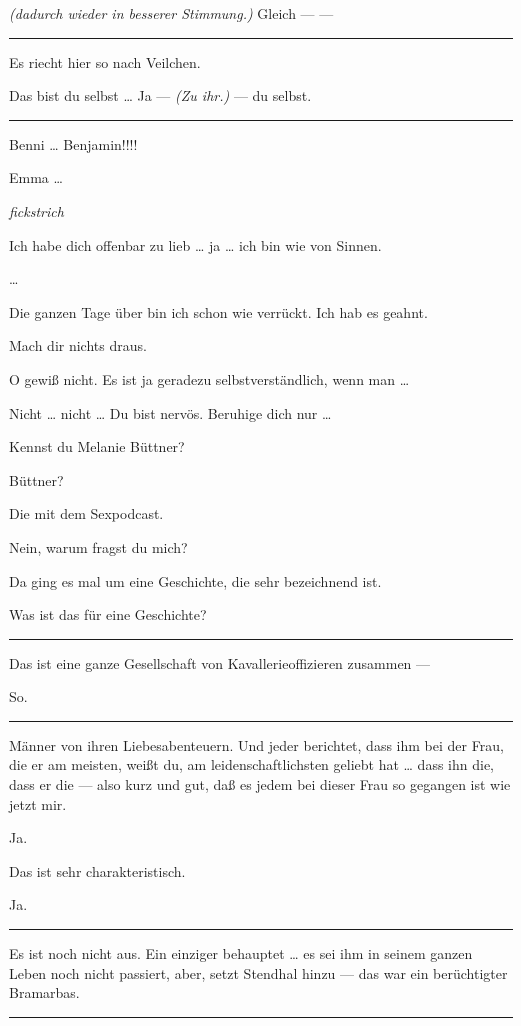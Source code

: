 \documentclass[
	final,
	a4paper,
	ngerman,
	mpinclude = true, %
	twoside = true,
	open = right,
	cleardoublepage = plain,
	DIV = 13,
	BCOR = 1cm,
	titlepage = firstiscover,
	]{scrbook}
\newcommand{\marginnote}[1]{\marginpar{\singlespacing\raggedright\footnotesize#1}}
\newcommand{\direction}[1]{\textit{(#1)}}
\newcommand{\hiat}{%
	\begin{center}
		\tiny
		\raisebox{0.5ex}{\rule{0.3\linewidth}{0.4pt}}
		\textit{fickstrich}
		\raisebox{0.5ex}{\rule{0.3\linewidth}{0.4pt}}
	\end{center}
}
\newenvironment{deletion}{%
		\vspace{0.25\baselineskip}
		\hrule
		\vspace{0.25\baselineskip}
		\color{darkgray}
	}{
		\color{black}
		\vspace{0.25\baselineskip}
		\hrule 
		\vspace{0.25\baselineskip}
	}
\newcommand{\thecharacter}[1]{\textup{\textsc{#1}}\xspace}
\newcommand{\theherr}{\thecharacter{Benjamin}}
\newcommand{\thefrau}{\thecharacter{Emma}}
\newcommand{\character}[1]{\item[#1:]}
\newcommand{\herr}{\character{\theherr}}
\newcommand{\frau}{\character{\thefrau}}
\begin{document}
\begin{play}
	\herr
	\direction{dadurch wieder in besserer Stimmung.} Gleich --- ---

	\begin{deletion}
	\frau
	Es riecht hier so nach Veilchen.

	\herr
	Das bist du selbst \ldots{} Ja --- \direction{Zu ihr.} --- du selbst.
	\end{deletion}

	\frau
	Benni \ldots{} Benjamin!!!!

	\herr
	Emma \ldots{}

	\marginnote{Er bekommt keinen hoch.}
	\hiat

	\herr
	Ich habe dich offenbar zu lieb \ldots{} ja \ldots{} ich bin wie von Sinnen.

	\frau
	\ldots{}

	\herr
	Die ganzen Tage über bin ich schon wie verrückt. Ich hab es geahnt.

	\frau
	Mach dir nichts draus.

	\herr
	O gewiß nicht. Es ist ja geradezu selbstverständlich, wenn man \ldots{}

	\frau
	Nicht \ldots{} nicht \ldots{} Du bist nervös. Beruhige dich nur \ldots{}

	\herr
	Kennst du Melanie Büttner?

	\frau
	Büttner?

	\herr
	Die mit dem Sexpodcast.

	\frau
	Nein, warum fragst du mich?

	\herr
	Da ging es mal um eine Geschichte, die sehr bezeichnend ist.

	\frau
	Was ist das für eine Geschichte?

	\begin{deletion}
	\herr
	Das ist eine ganze Gesellschaft von Kavallerieoffizieren zusammen ---

	\frau
	So.
	\end{deletion}

	\herr
	Männer von ihren Liebesabenteuern. Und jeder berichtet, dass ihm bei der Frau, die er am meisten, weißt du, am leidenschaftlichsten geliebt hat \ldots{} dass ihn die, dass er die --- also kurz und gut, daß es jedem bei dieser Frau so gegangen ist wie jetzt mir.

	\frau
	Ja.

	\herr
	Das ist sehr charakteristisch.

	\frau
	Ja.
	\begin{deletion}

	\herr
	Es ist noch nicht aus. Ein einziger behauptet \ldots{} es sei ihm in seinem ganzen Leben noch nicht passiert, aber, setzt Stendhal hinzu --- das war ein berüchtigter Bramarbas.


\end{deletion}
\end{play}
\end{document}
